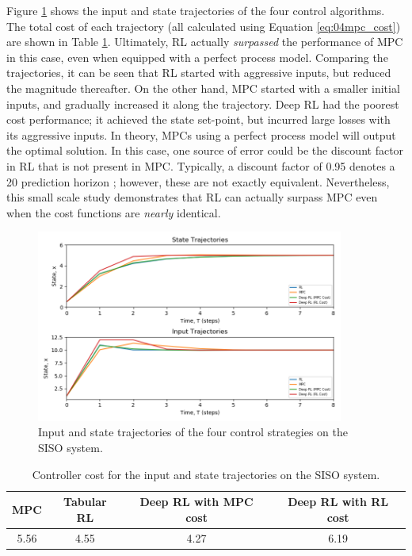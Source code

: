 Figure \ref{fig:04SISOcomp} shows the input and state trajectories of the four control algorithms. The total cost of each trajectory (all calculated using Equation \ref{eq:04mpc_cost}) are shown in Table \ref{tab:04SISOCost}. Ultimately, RL actually \textit{surpassed} the performance of MPC in this case, even when equipped with a perfect process model. Comparing the trajectories, it can be seen that RL started with aggressive inputs, but reduced the magnitude thereafter.  On the other hand, MPC started with a smaller initial inputs, and gradually increased it along the trajectory. Deep RL had the poorest cost performance; it achieved the state set-point, but incurred large losses with its aggressive inputs. In theory, MPCs using a perfect process model will output the optimal solution.  In this case, one source of error could be the discount factor in RL that is not present in MPC. Typically, a discount factor of 0.95 denotes a 20 prediction horizon \cite{deeplearning_course}; however, these are not exactly equivalent. Nevertheless, this small scale study demonstrates that RL can actually surpass MPC even when the cost functions are \textit{nearly} identical.  

\begin{figure}[H]
    \centering
    \includegraphics[width=0.9\textwidth]{images/ch4/States_and_Inputs_SISO2.png}
    \caption{Input and state trajectories of the four control strategies on the SISO system.}
    \label{fig:04SISOcomp}
\end{figure}

\begin{table}[H]
\caption{Controller cost for the input and state trajectories on the SISO system.}
\label{tab:04SISOCost}
\centering
\begin{tabular}{c|c|c|c}
\textbf{MPC} & \textbf{Tabular RL} & \textbf{Deep RL with MPC cost}& \textbf{Deep RL with RL cost} \\
\hline
5.56	     & 4.55	               & 4.27                         & 6.19	 \\
\end{tabular}
\end{table}








